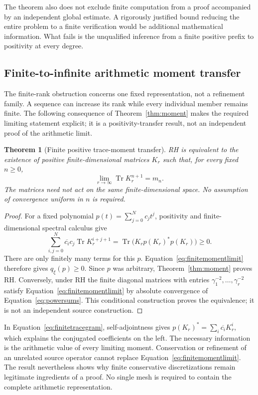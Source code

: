 \documentclass[11pt,letterpaper]{article}
\numberwithin{equation}{section}
\newtheorem{theorem}{Theorem}[section]
\theoremstyle{definition}
\theoremstyle{remark}
\DeclareMathOperator{\Tr}{Tr}
\begin{document}
The theorem also does not exclude finite computation from a proof accompanied by an independent global estimate. A rigorously justified bound reducing the entire problem to a finite verification would be additional mathematical information. What fails is the unqualified inference from a finite positive prefix to positivity at every degree.

\subsection{Finite-to-infinite arithmetic moment transfer}
\label{subsec:momentlimit}
The finite-rank obstruction concerns one fixed representation, not a refinement family. A sequence can increase its rank while every individual member remains finite. The following consequence of Theorem~\ref{thm:moment} makes the required limiting statement explicit; it is a positivity-transfer result, not an independent proof of the arithmetic limit.

\begin{theorem}[Finite positive trace-moment transfer]
\label{thm:finitemomenttransfer}
RH is equivalent to the existence of positive finite-dimensional matrices $K_r$ such that, for every fixed $n\geq0$,
\begin{equation}
 \lim_{r\to\infty}\Tr K_r^{n+1}=m_n.
 \label{eq:finitemomentlimit}
\end{equation}
The matrices need not act on the same finite-dimensional space. No assumption of convergence uniform in $n$ is required.
\end{theorem}
\begin{proof}
For a fixed polynomial $p(t)=\sum_{j=0}^{N}c_jt^j$, positivity and finite-dimensional spectral calculus give
\begin{equation}
 \sum_{i,j=0}^{N}\overline{c_i}c_j\Tr K_r^{i+j+1}
 =\Tr\bigl(K_r p(K_r)^{*}p(K_r)\bigr)\geq0.
 \label{eq:finitetracegram}
\end{equation}
There are only finitely many terms for this $p$. Equation~\eqref{eq:finitemomentlimit} therefore gives $q_\xi(p)\geq0$. Since $p$ was arbitrary, Theorem~\ref{thm:moment} proves RH. Conversely, under RH the finite diagonal matrices with entries $\gamma_1^{-2},\ldots,\gamma_r^{-2}$ satisfy Equation~\eqref{eq:finitemomentlimit} by absolute convergence of Equation~\eqref{eq:powersums}. This conditional construction proves the equivalence; it is not an independent source construction.
\end{proof}

In Equation~\eqref{eq:finitetracegram}, self-adjointness gives $p(K_r)^*=\sum_i\overline{c_i}K_r^i$, which explains the conjugated coefficients on the left. The necessary information is the arithmetic value of every limiting moment. Conservation or refinement of an unrelated source operator cannot replace Equation~\eqref{eq:finitemomentlimit}. The result nevertheless shows why finite conservative discretizations remain legitimate ingredients of a proof. No single mesh is required to contain the complete arithmetic representation.
\end{document}
